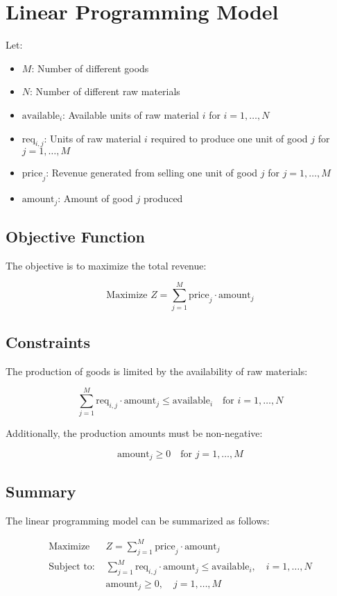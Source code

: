 \documentclass{article}
\begin{document}
\section*{Linear Programming Model}

Let:
\begin{itemize}
    \item \( M \): Number of different goods
    \item \( N \): Number of different raw materials
    \item \( \text{available}_i \): Available units of raw material \( i \) for \( i = 1, \ldots, N \)
    \item \( \text{req}_{i,j} \): Units of raw material \( i \) required to produce one unit of good \( j \) for \( j = 1, \ldots, M \)
    \item \( \text{price}_j \): Revenue generated from selling one unit of good \( j \) for \( j = 1, \ldots, M \)
    \item \( \text{amount}_j \): Amount of good \( j \) produced
\end{itemize}

\subsection*{Objective Function}
The objective is to maximize the total revenue:

\[
\text{Maximize } Z = \sum_{j=1}^{M} \text{price}_j \cdot \text{amount}_j
\]

\subsection*{Constraints}
The production of goods is limited by the availability of raw materials:

\[
\sum_{j=1}^{M} \text{req}_{i,j} \cdot \text{amount}_j \leq \text{available}_i \quad \text{for } i = 1, \ldots, N
\]

Additionally, the production amounts must be non-negative:

\[
\text{amount}_j \geq 0 \quad \text{for } j = 1, \ldots, M
\]

\subsection*{Summary}
The linear programming model can be summarized as follows:

\begin{align*}
\text{Maximize } & Z = \sum_{j=1}^{M} \text{price}_j \cdot \text{amount}_j \\
\text{Subject to: } & \sum_{j=1}^{M} \text{req}_{i,j} \cdot \text{amount}_j \leq \text{available}_i, \quad i = 1, \ldots, N \\
& \text{amount}_j \geq 0, \quad j = 1, \ldots, M
\end{align*}
\end{document}
